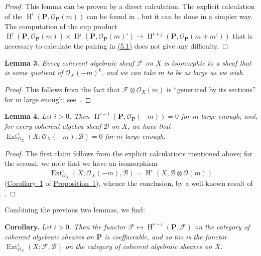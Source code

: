 \documentclass{article}
\newenvironment{itenv}[1]
  {\phantomsection\par\medskip\noindent\textbf{#1.}\itshape}
  {\par\medskip}
\newcommand{\scr}[1]{{\mathscr{#1}}}
\newcommand{\bb}{\mathbf}
\DeclareMathOperator{\Ext}{Ext}
\DeclareMathOperator{\HH}{H}
\begin{document}
\begin{proof}
  This lemma can be proven by a direct calculation.
  The explicit calculation of the $\HH^i(\bb{P},\scr{O}_\bb{P}(m))$ can be found in \cite{3}, but it can be done in a simpler way.
  The computation of the cup product $\HH^i(\bb{P},\scr{O}_\bb{P}(m))\times\HH^j(\bb{P},\scr{O}_\bb{P}(m)') \to \HH^{i+j}(\bb{P},\scr{O}_\bb{P}(m+m'))$ that is necessary to calculate the pairing in \hyperref[5.1]{(5.1)} does not give any difficulty.
\end{proof}

\begin{itenv}{Lemma 3}
\label{lemma3}
  Every coherent algebraic sheaf $\scr{F}$ on $X$ is isomorphic to a sheaf that is some quotient of $\scr{O}_X(-m)^k$, and we can take $m$ to be as large as we wish.
\end{itenv}

\begin{proof}
  This follows from the fact that $\scr{F}\otimes\scr{O}_X(m)$ is ``generated by its sections'' for $m$ large enough; see~\cite{3}.
\end{proof}

\begin{itenv}{Lemma 4}
\label{lemma4}
  Let $i>0$.
  Then $\HH^{r-i}(\bb{P},\scr{O}_\bb{P}(-m))=0$ for $m$ large enough;
  and, for every coherent algebra sheaf $\scr{B}$ on $X$, we have that $\Ext_{\scr{O}_X}^i(X;\scr{O}_X(-m),\scr{B})=0$ for $m$ large enough.
\end{itenv}

\begin{proof}
  The first claim follows from the explicit calculations mentioned above;
  for the second, we note that we have an isomorphism
  \[
    \Ext_{\scr{O}_X}^i(X;\scr{O}_X(-m),\scr{B}) = \HH^i(X,\scr{B}\otimes\scr{O}(m))
  \]
  (\hyperref[proposition1corollary1]{Corollary~1} of \hyperref[proposition1]{Proposition~1}), whence the conclusion, by a well-known result of \cite{3}.
\end{proof}

Combining the previous two lemmas, we find:

\begin{itenv}{Corollary}
\label{lemma3andlemma4corollary}
  Let $i>0$.
  Then the functor $\scr{F}\mapsto\HH^{r-i}(\bb{P},\scr{F})$ on the category of coherent algebraic sheaves on $\bb{P}$ is coeffaceable, and so too is the functor $\Ext_{\scr{O}_X}^i(X;\scr{F},\scr{B})$ on the category of coherent algebraic sheaves on $X$.
\end{itenv}
\end{document}
